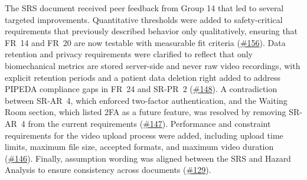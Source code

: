 \documentclass{article}
\begin{document}
The SRS document received peer feedback from Group 14 that led to several targeted improvements. Quantitative thresholds were added to safety-critical requirements that previously described behavior only qualitatively, ensuring that FR~14 and FR~20 are now testable with measurable fit criteria (\href{https://github.com/M9Huynh/technically-functional/issues/156}{\#156}). Data retention and privacy requirements were clarified to reflect that only biomechanical metrics are stored server-side and never raw video recordings, with explicit retention periods and a patient data deletion right added to address PIPEDA compliance gaps in FR~24 and SR-PR~2 (\href{https://github.com/M9Huynh/technically-functional/issues/148}{\#148}). A contradiction between SR-AR~4, which enforced two-factor authentication, and the Waiting Room section, which listed 2FA as a future feature, was resolved by removing SR-AR~4 from the current requirements (\href{https://github.com/M9Huynh/technically-functional/issues/147}{\#147}). Performance and constraint requirements for the video upload process were added, including upload time limits, maximum file size, accepted formats, and maximum video duration (\href{https://github.com/M9Huynh/technically-functional/issues/146}{\#146}). Finally, assumption wording was aligned between the SRS and Hazard Analysis to ensure consistency across documents (\href{https://github.com/M9Huynh/technically-functional/issues/129}{\#129}).
\end{document}
